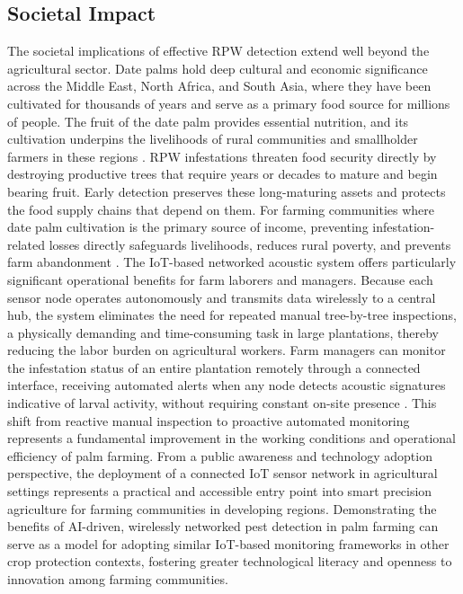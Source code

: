\documentclass[12pt,a4paper,oneside]{memoir}
\begin{document}
\subsection{Societal Impact}
 
The societal implications of effective RPW detection extend well beyond the agricultural sector. Date palms hold deep cultural and economic significance across the Middle East, North Africa, and South Asia, where they have been cultivated for thousands of years and serve as a primary food source for millions of people. The fruit of the date palm provides essential nutrition, and its cultivation underpins the livelihoods of rural communities and smallholder farmers in these regions \cite{saleem2022}. RPW infestations threaten food security directly by destroying productive trees that require years or decades to mature and begin bearing fruit. Early detection preserves these long-maturing assets and protects the food supply chains that depend on them. For farming communities where date palm cultivation is the primary source of income, preventing infestation-related losses directly safeguards livelihoods, reduces rural poverty, and prevents farm abandonment \cite{saleem2022}. The IoT-based networked acoustic system offers particularly significant operational benefits for farm laborers and managers. Because each sensor node operates autonomously and transmits data wirelessly to a central hub, the system eliminates the need for repeated manual tree-by-tree inspections, a physically demanding and time-consuming task in large plantations, thereby reducing the labor burden on agricultural workers. Farm managers can monitor the infestation status of an entire plantation remotely through a connected interface, receiving automated alerts when any node detects acoustic signatures indicative of larval activity, without requiring constant on-site presence \cite{karar2021}. This shift from reactive manual inspection to proactive automated monitoring represents a fundamental improvement in the working conditions and operational efficiency of palm farming. From a public awareness and technology adoption perspective, the deployment of a connected IoT sensor network in agricultural settings represents a practical and accessible entry point into smart precision agriculture for farming communities in developing regions. Demonstrating the benefits of AI-driven, wirelessly networked pest detection in palm farming can serve as a model for adopting similar IoT-based monitoring frameworks in other crop protection contexts, fostering greater technological literacy and openness to innovation among farming communities.
 
\end{document}
